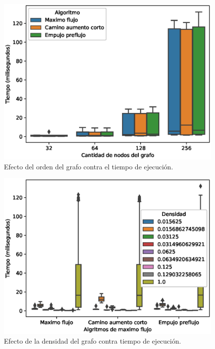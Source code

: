 \documentclass[12pt, a4paper]{article}
\begin{document}
\begin{figure} [H] \centering
\includegraphics[scale=0.8]{figura3}
\caption{Efecto del orden del grafo contra el tiempo de ejecuci\'on.}
\label{fig: orden}
\end{figure}

\begin{figure} [H] \centering
\includegraphics[scale=0.8]{figura4}
\caption{Efecto de la densidad del grafo contra tiempo de ejecuci\'on.}
\label{fig: densidad}
\end{figure}
\end{document}
